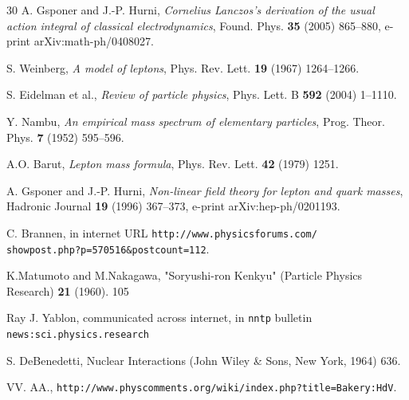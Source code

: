 \documentclass[12pt,a4paper]{article}
\begin{document}
\begin{thebibliography}{30}
 A. Gsponer and J.-P. Hurni, {\it Cornelius Lanczos's derivation of the usual action integral of classical electrodynamics}, Found. Phys. {\bf 35} (2005) 865--880, e-print arXiv:math-ph/0408027.

 S. Weinberg, \emph{A model of leptons}, Phys. Rev. Lett. {\bf 19} (1967) 1264--1266.

 S. Eidelman et al., {\it Review of particle physics}, Phys. Lett. B {\bf 592} (2004) 1--1110.

 Y. Nambu, {\it An empirical mass spectrum of elementary particles}, Prog. Theor. Phys. {\bf 7} (1952) 595--596.

 A.O. Barut, {\it Lepton mass formula}, Phys. Rev. Lett. {\bf 42} (1979) 1251.

 A. Gsponer and J.-P. Hurni, {\it Non-linear  field  theory  for lepton  and quark masses}, Hadronic Journal {\bf 19} (1996) 367--373, e-print arXiv:hep-ph/0201193.

 C. Brannen, in internet URL {\tt http://www.physicsforums.com/\\ showpost.php?p=570516\&postcount=112}.

 K.Matumoto and M.Nakagawa, "Soryushi-ron Kenkyu"
(Particle Physics Research) {\bf 21} (1960). 105

  Ray J. Yablon, communicated across internet, in {\tt nntp} bulletin {\tt news:sci.physics.research}

 S. DeBenedetti, Nuclear Interactions (John Wiley \& Sons, New York, 1964) 636.

 VV. AA., {\tt http://www.physcomments.org/wiki/}{\tt index.php?}{\tt title=Bakery:HdV}.


\end{thebibliography}
\end{document}
